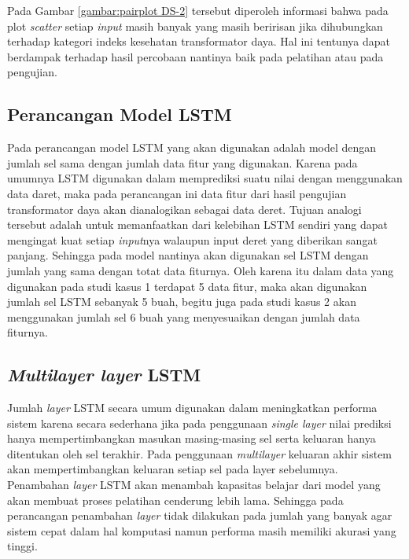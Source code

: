 Pada Gambar \ref{gambar:pairplot DS-2} tersebut diperoleh informasi bahwa pada plot \textit{scatter} setiap \textit{input} masih banyak yang masih beririsan jika dihubungkan terhadap kategori indeks kesehatan transformator daya. Hal ini tentunya dapat berdampak terhadap hasil percobaan nantinya baik pada pelatihan atau pada pengujian.

\subsection{Perancangan Model LSTM}
Pada perancangan model LSTM yang akan digunakan adalah model dengan jumlah sel sama dengan jumlah data fitur yang digunakan. Karena pada umumnya LSTM digunakan dalam memprediksi suatu nilai dengan menggunakan data daret, maka pada perancangan ini data fitur dari hasil pengujian transformator daya akan dianalogikan sebagai data deret. Tujuan analogi tersebut adalah untuk memanfaatkan dari kelebihan LSTM sendiri yang dapat mengingat kuat setiap \textit{input}nya walaupun input deret yang diberikan sangat panjang. Sehingga pada model nantinya akan digunakan sel LSTM dengan jumlah yang sama dengan totat data fiturnya. Oleh karena itu dalam data yang digunakan pada studi kasus 1 terdapat 5 data fitur, maka akan digunakan jumlah sel LSTM sebanyak 5 buah, begitu juga pada studi kasus 2 akan menggunakan jumlah sel 6 buah yang menyesuaikan dengan jumlah data fiturnya.

\subsection{\textit{Multilayer layer} LSTM}
Jumlah \textit{layer} LSTM secara umum digunakan dalam meningkatkan performa sistem karena secara sederhana jika pada penggunaan \textit{single layer} nilai prediksi hanya mempertimbangkan masukan masing-masing sel serta keluaran hanya ditentukan oleh sel terakhir. Pada penggunaan \textit{multilayer} keluaran akhir sistem akan mempertimbangkan keluaran setiap sel pada layer sebelumnya. Penambahan \textit{layer} LSTM akan menambah kapasitas belajar dari model yang akan membuat proses pelatihan cenderung lebih lama. Sehingga pada perancangan penambahan \textit{layer} tidak dilakukan pada jumlah yang banyak agar sistem cepat dalam hal komputasi namun performa masih memiliki akurasi yang tinggi. 

